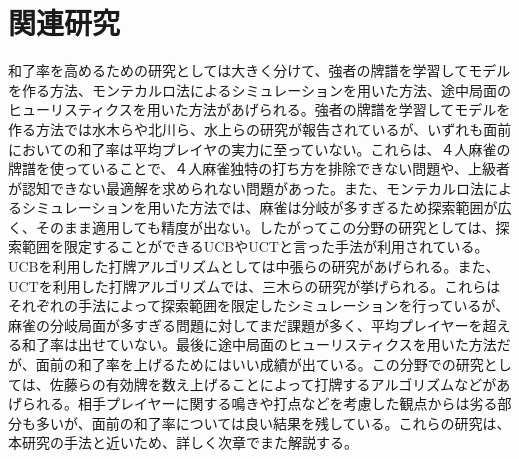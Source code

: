 \section{関連研究}
和了率を高めるための研究としては大きく分けて、強者の牌譜を学習してモデルを作る方法、モンテカルロ法によるシミュレーションを用いた方法、途中局面のヒューリスティクスを用いた方法があげられる。強者の牌譜を学習してモデルを作る方法では水木ら\cite{miki}や北川ら\cite{kitakawa}、水上ら\cite{bakuuti}の研究が報告されているが、いずれも面前においての和了率は平均プレイヤの実力に至っていない。これらは、４人麻雀の牌譜を使っていることで、４人麻雀独特の打ち方を排除できない問題や、上級者が認知できない最適解を求められない問題があった。また、モンテカルロ法によるシミュレーションを用いた方法では、麻雀は分岐が多すぎるため探索範囲が広く、そのまま適用しても精度が出ない。したがってこの分野の研究としては、探索範囲を限定することができるUCB\cite{UCB}やUCT\cite{UCT}と言った手法が利用されている。UCBを利用した打牌アルゴリズムとしては中張らの研究が\cite{LinUCB_mahjong}あげられる。また、UCTを利用した打牌アルゴリズムでは、三木らの研究が\cite{miki}挙げられる。これらはそれぞれの手法によって探索範囲を限定したシミュレーションを行っているが、麻雀の分岐局面が多すぎる問題に対してまだ課題が多く、平均プレイヤーを超える和了率は出せていない。最後に途中局面のヒューリスティクスを用いた方法だが、面前の和了率を上げるためにはいい成績が出ている。この分野での研究としては、佐藤らの有効牌を数え上げることによって打牌するアルゴリズム\cite{zentsu}などがあげられる。相手プレイヤーに関する鳴きや打点などを考慮した観点からは劣る部分も多いが、面前の和了率については良い結果を残している。これらの研究は、本研究の手法と近いため、詳しく次章でまた解説する。




